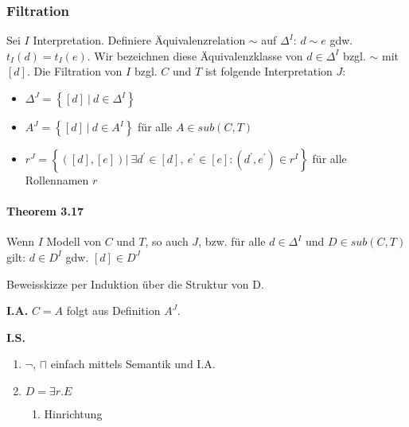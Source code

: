\subsubsection{Filtration}\label{filtration}

Sei $I$ Interpretation. Definiere Äquivalenzrelation $\sim$ auf
$\Delta^{I}$: $d \sim e$ gdw.
$t_{I}\left( d \right) = t_{I}\left( e \right)$. Wir bezeichnen diese
Äquivalenzklasse von $d \in \Delta^{I}$ bzgl. $\sim$ mit
$\left\lbrack d \right\rbrack$. Die Filtration von $I$ bzgl. $C$
und $T$ ist folgende Interpretation $J$:

\begin{itemize}
\item
  $\Delta^{J} = \left\{ \left\lbrack d \right\rbrack\ |\ d \in \Delta^{I} \right\}$
\item
  $A^{J} = \left\{ \left\lbrack d \right\rbrack\ |\ d \in A^{I} \right\}$
  für alle $A \in sub\left( C,T \right)$
\item
  $r^{J} = \left\{ \left( \left\lbrack d \right\rbrack,\left\lbrack e \right\rbrack \right)|\ \exists d^{'} \in \left\lbrack d \right\rbrack,\ e^{'} \in \left\lbrack e \right\rbrack:\left( d^{'},e^{'} \right) \in r^{I} \right\}$
  für alle Rollennamen $r$
\end{itemize}

\hypertarget{theorem-3.17}{\paragraph{Theorem 3.17}\label{theorem-3.17}}

Wenn $I$ Modell von $C$ und $T$, so auch $J$, bzw. für alle
$d \in \Delta^{I}$ und $D \in sub(C,T)$ gilt: $d \in D^{I}$ gdw.
$\left\lbrack d \right\rbrack \in D^{J}$

Beweisskizze per Induktion über die Struktur von D.

\textbf{I.A.} $C = A$ folgt aus Definition $A^{J}$.

\textbf{I.S.}

\begin{enumerate}
\def\labelenumi{\arabic{enumi}.}
\item
  $\neg$, $\sqcap$ einfach mittels Semantik und I.A.
\item
  $D = \exists r.E$

  \begin{enumerate}
  \def\labelenumii{\alph{enumii}.}
  \item
    Hinrichtung
  \end{enumerate}
\end{enumerate}

